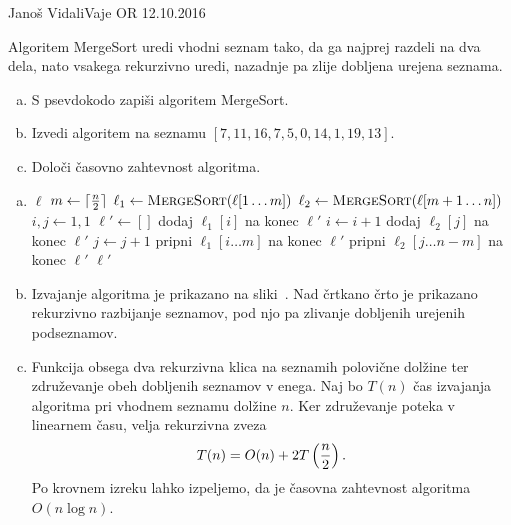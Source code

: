 \begin{naloga}{Janoš Vidali}{Vaje OR 12.10.2016}
\begin{vprasanje}
Algoritem {\sc MergeSort} uredi vhodni seznam tako,
da ga najprej razdeli na dva dela,
nato vsakega rekurzivno uredi,
nazadnje pa zlije dobljena urejena seznama.
\begin{enumerate}[(a)]
\item S psevdokodo zapiši algoritem {\sc MergeSort}.
\item Izvedi algoritem na seznamu $[7, 11, 16, 7, 5, 0, 14, 1, 19, 13]$.
\item Določi časovno zahtevnost algoritma.
\end{enumerate}
\end{vprasanje}

\begin{odgovor}
\begin{enumerate}[(a)]
\item
\begin{small}
\begin{algorithmic}
        \State \Return $\ell$
    \EndIf
    \State $m \gets \lceil {n \over 2} \rceil$
    \State $\ell_1 \gets \text{\sc MergeSort}(\ell[1 \dots m])$
    \State $\ell_2 \gets \text{\sc MergeSort}(\ell[m+1 \dots n])$
    \State $i, j \gets 1, 1$
    \State $\ell' \gets []$
            \State dodaj $\ell_1[i]$ na konec $\ell'$
            \State $i \gets i+1$
        \Else
            \State dodaj $\ell_2[j]$ na konec $\ell'$
            \State $j \gets j+1$
        \EndIf
    \EndWhile
    \State pripni $\ell_1[i \dots m]$ na konec $\ell'$
    \State pripni $\ell_2[j \dots n-m]$ na konec $\ell'$
    \State \Return $\ell'$
\EndFunction
\end{algorithmic}
\end{small}

\item Izvajanje algoritma je prikazano na sliki~\fig.
Nad črtkano črto je prikazano rekurzivno razbijanje seznamov,
pod njo pa zlivanje dobljenih urejenih podseznamov.

\item Funkcija obsega dva rekurzivna klica na seznamih polovične dolžine
ter združevanje obeh dobljenih seznamov v enega.
Naj bo $T(n)$ čas izvajanja algoritma pri vhodnem seznamu dolžine $n$.
Ker združevanje poteka v linearnem času, velja rekurzivna zveza
$$
T(n) = O(n) + 2T\left({n \over 2}\right) .
$$
Po krovnem izreku lahko izpeljemo,
da je časovna zahtevnost algoritma $O(n \log n)$.
\end{enumerate}

\begin{slika}
\pgfslika
{}
\end{slika}
\end{odgovor}
\end{naloga}
